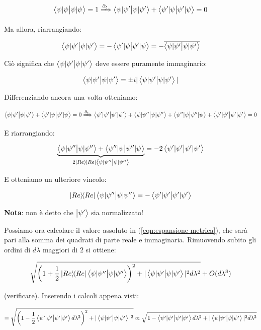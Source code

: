 \documentclass[main_zanardi.tex]{subfiles}
\begin{document}
\begin{align*}
\braket{\psi|\psi} = 1 \xRightarrow{\partial_t} \braket{\psi|\psi'} + \braket{\psi'|\psi} =0
\end{align*}

Ma allora, riarrangiando:

\begin{align*}
\braket{\psi|\psi'} = - \braket{\psi'|\psi} = - \overline{\braket{\psi|\psi'}}
\end{align*}

Ciò significa che $\braket{\psi|\psi'}$ deve essere puramente immaginario:

\begin{align*}
\braket{\psi|\psi'} = \pm i |\braket{\psi|\psi'}|
\end{align*}

Differenziando ancora una volta otteniamo:

\begin{align*}
 \braket{\psi|\psi'} + \braket{\psi'|\psi} =0 \xRightarrow{\partial_t} \braket{\psi'|\psi'} + \braket{\psi|\psi''} + \braket{\psi''|\psi} + \braket{\psi'|\psi'} = 0
\end{align*}

E riarrangiando:

\begin{align*}
\underbrace{\braket{\psi|\psi''} + \braket{\psi''|\psi}}_{2\op{Re}\braket{\psi|\psi''}} = -2\braket{\psi'|\psi'}
\end{align*}

E otteniamo un ulteriore vincolo:

\begin{align*}
\op{Re}\braket{\psi|\psi''} = -\braket{\psi'|\psi'}
\end{align*}

\textbf{Nota}: non è detto che $\ket{\psi'}$ sia normalizzato!

Possiamo ora calcolare il valore assoluto in (\ref{eqn:espansione-metrica}), che sarà pari alla somma dei quadrati di parte reale e immaginaria. Rimuovendo subito gli ordini di $d\lambda$ maggiori di $2$ si ottiene:

\begin{align*}
\sqrt{\left(1+\frac{1}{2}\op{Re}\braket{\psi|\psi''}\right)^2 + |\braket{\psi|\psi'}|^2 d\lambda^2} + O(d\lambda^3)
\end{align*}

(verificare). Inserendo i calcoli appena visti:

\begin{align*}
= \sqrt{\left(1-\frac{1}{2}\braket{\psi'|\psi'} d\lambda^2\right)^2 + |\braket{\psi|\psi'}|^2 } \propto \sqrt{1-\braket{\psi'|\psi' }d\lambda^2 + |\braket{\psi|\psi'}|^2 d\lambda^2}
\end{align*}
\end{document}
